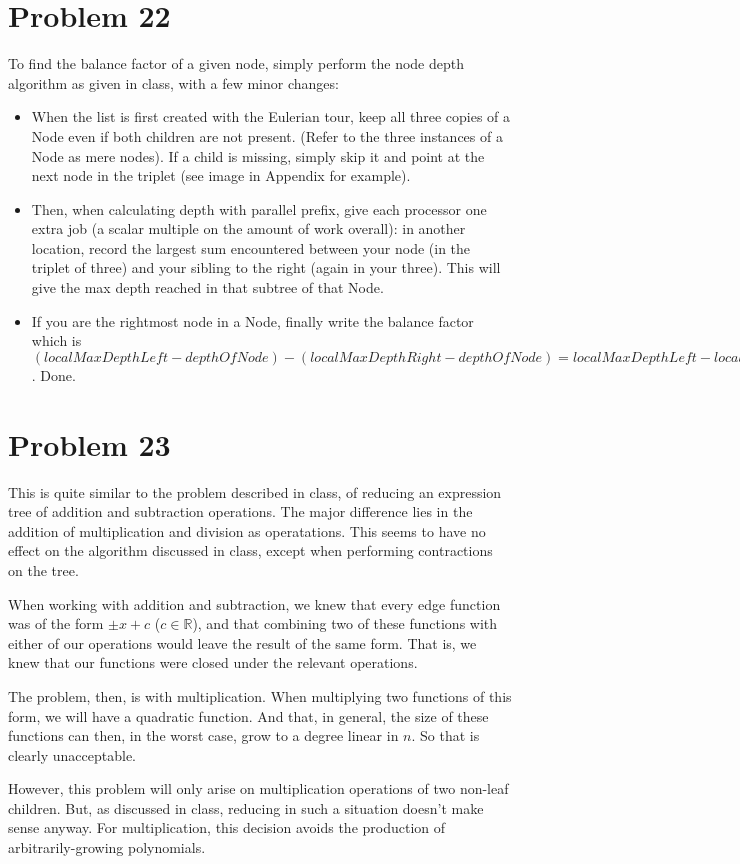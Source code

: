 \documentclass{article}
\providecommand{\prob}[1]{\section*{Problem #1}}
\providecommand{\R}{\mathbb{R}}
\begin{document}
\prob{22}
To find the balance factor of a given node, simply perform the node depth algorithm as given in class, with a few minor changes:
\begin{itemize}
  \item When the list is first created with the Eulerian tour, keep all three copies of a Node even if both children are not present. (Refer to the three instances of a Node as mere nodes). If a child is missing, simply skip it and point at the next node in the triplet (see image in Appendix for example).
  \item Then, when calculating depth with parallel prefix, give each processor one extra job (a scalar multiple on the amount of work overall): in another location, record the largest sum encountered between your node (in the triplet of three) and your sibling to the right (again in your three). This will give the max depth reached in that subtree of that Node.
  \item If you are the rightmost node in a Node, finally write the balance factor which is $(localMaxDepthLeft - depthOfNode) - (localMaxDepthRight - depthOfNode) = localMaxDepthLeft - localMaxDepthRight$. Done.
\end{itemize}



\prob{23}
This is quite similar to the problem described in class, of reducing an expression tree of addition and subtraction operations.
The major difference lies in the addition of multiplication and division as operatations.
This seems to have no effect on the algorithm discussed in class, except when performing contractions on the tree.

When working with addition and subtraction, we knew that every edge function was of the form $\pm x + c$ ($c \in \R$), and that combining two of these functions with either of our operations would leave the result of the same form.
That is, we knew that our functions were closed under the relevant operations.

The problem, then, is with multiplication.
When multiplying two functions of this form, we will have a quadratic function.
And that, in general, the size of these functions can then, in the worst case, grow to a degree linear in $n$.
So that is clearly unacceptable.

However, this problem will only arise on multiplication operations of two non-leaf children.
But, as discussed in class, reducing in such a situation doesn't make sense anyway.
For multiplication, this decision avoids the production of arbitrarily-growing polynomials.
\end{document}
